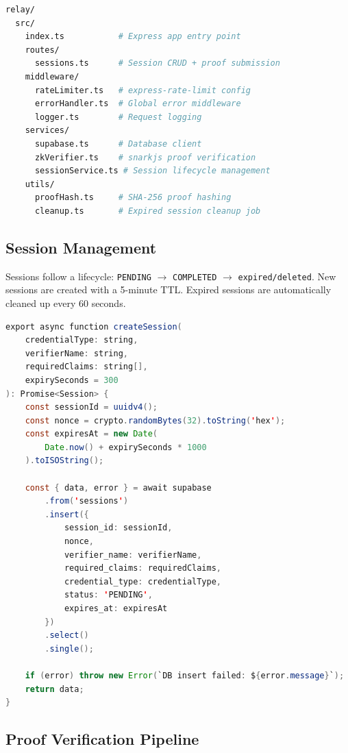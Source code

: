 \begin{lstlisting}[language=bash, caption={Relay Server File Structure}]
relay/
  src/
    index.ts           # Express app entry point
    routes/
      sessions.ts      # Session CRUD + proof submission
    middleware/
      rateLimiter.ts   # express-rate-limit config
      errorHandler.ts  # Global error middleware
      logger.ts        # Request logging
    services/
      supabase.ts      # Database client
      zkVerifier.ts    # snarkjs proof verification
      sessionService.ts # Session lifecycle management
    utils/
      proofHash.ts     # SHA-256 proof hashing
      cleanup.ts       # Expired session cleanup job
\end{lstlisting}

\subsection{Session Management}

Sessions follow a lifecycle: \texttt{PENDING} $\rightarrow$ \texttt{COMPLETED} $\rightarrow$ \texttt{expired/deleted}. New sessions are created with a 5-minute TTL. Expired sessions are automatically cleaned up every 60 seconds.

\begin{lstlisting}[language=Java, caption={Session Creation (sessionService.ts)}]
export async function createSession(
    credentialType: string,
    verifierName: string,
    requiredClaims: string[],
    expirySeconds = 300
): Promise<Session> {
    const sessionId = uuidv4();
    const nonce = crypto.randomBytes(32).toString('hex');
    const expiresAt = new Date(
        Date.now() + expirySeconds * 1000
    ).toISOString();
    
    const { data, error } = await supabase
        .from('sessions')
        .insert({
            session_id: sessionId,
            nonce,
            verifier_name: verifierName,
            required_claims: requiredClaims,
            credential_type: credentialType,
            status: 'PENDING',
            expires_at: expiresAt
        })
        .select()
        .single();
    
    if (error) throw new Error(`DB insert failed: ${error.message}`);
    return data;
}
\end{lstlisting}

\subsection{Proof Verification Pipeline}

